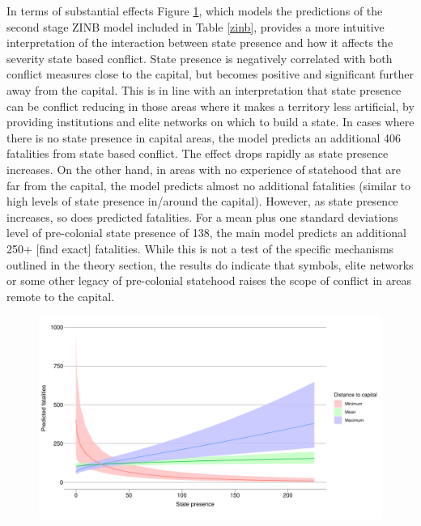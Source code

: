 \documentclass[12pt]{article}
\begin{document}
In terms of substantial effects Figure \ref{deaths_zinb}, which models the
predictions of the second stage ZINB model included in Table \ref{zinb},
provides a more intuitive interpretation of the interaction between state
presence and how it affects the severity state based conflict. State presence is
negatively correlated with both conflict measures close to the capital, but
becomes positive and significant further away from the capital. This is in line
with an interpretation that state presence can be conflict reducing in those
areas where it makes a territory less artificial, by providing institutions and
elite networks on which to build a state. In cases where there is no state
presence in capital areas, the model predicts an additional 406 fatalities from
state based conflict. The effect drops rapidly as state presence increases. On
the other hand, in areas with no experience of statehood that are far from the
capital, the model predicts almost no additional fatalities (similar to high
levels of state presence in/around the capital). However, as state presence
increases, so does predicted fatalities. For a mean plus one standard deviations
level of pre-colonial state presence of 138, the main model predicts an
additional 250+ [find exact]
fatalities. While this is not a test of the specific mechanisms outlined in the
theory section, the results do indicate that symbols, elite networks or
some other legacy of pre-colonial statehood raises the scope of conflict
in areas remote to the capital.


\begin{figure}[htpb]
	\centering
	\includegraphics[width=\linewidth]{"../R/Output/zinbplot.pdf"}
	\caption{}
	\label{deaths_zinb}
\end{figure}
\end{document}

